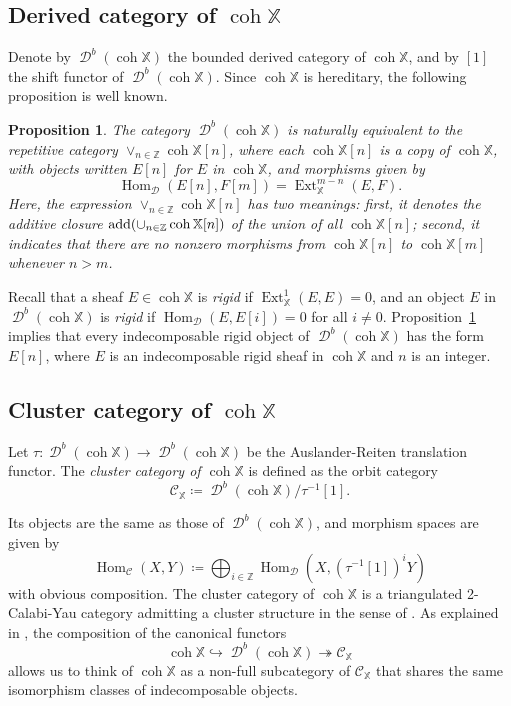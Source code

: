 \documentclass[11pt,a4paper,reqno]{amsart}%
\theoremstyle{plain}
\newtheorem{proposition}[proposition]{Proposition}
\theoremstyle{definition}
\numberwithin{equation}{section}
\numberwithin{equation}{section}
\def\ZZ{\mathbb{Z}}
\def\XX{\mathbb{X}}
\newcommand{\cC}{\mathcal{C}}
\newcommand{\cD}{\mathcal{D}}
\newcommand{\Hom}{\operatorname{Hom}\nolimits}
\newcommand{\Ext}{\operatorname{Ext}\nolimits}
\newcommand{\D}{\operatorname{\mathcal{D}}}
\def\coh{\operatorname{coh}}
\def\Dcoh{\D^b(\coh \XX)}
\def\Hom{\operatorname{Hom}}
\def\Ext{\operatorname{Ext}}
\def\coh{\operatorname{coh}}
\begin{document}
\subsection{Derived category of $\coh\XX$} 
Denote by $\Dcoh$ the   bounded derived category of $\coh\XX$,  and by $[1]$ the   shift   functor of $\Dcoh$.  
Since $\coh\XX$ is hereditary,  
 the following proposition is well known.

\begin{proposition}\label{prop:db}
    The category $\Dcoh$ is naturally equivalent to the repetitive category  $\lor_{n\in\ZZ}\coh\XX[n]$,
where each  $\coh\XX[n]$ is a copy of $\coh\XX$, with objects written $E[n]$ for $E$ in  $\coh\XX$, and
morphisms given by
\[
\Hom_{\cD}(E[n], F[m])=\Ext_{\XX}^{m-n}(E,F).
\]  
 Here, the expression   $\lor_{n\in\ZZ}\coh\XX[n]$ has two meanings: first, it denotes the additive closure   ${\rm add}(\cup_{n\in\ZZ}\coh\XX[n])$  of the union of all  $\coh\XX[n]$; second, it indicates that there are no nonzero morphisms  from  $\coh\XX[n]$  to $\coh\XX[m]$ 
whenever $n > m$.
\end{proposition}
 

  Recall that   a sheaf $E\in\coh\XX$ is   \emph{rigid} if $\Ext^1_\XX(E,E)=0$, and 
 an object $E$ in $\Dcoh$ is  \emph{rigid} if $\Hom_{\cD}(E, E[i])= 0$ for all $i\ne0$.  Proposition~\ref{prop:db} implies that every indecomposable rigid object of  $\Dcoh$  has the form $E[n]$, where $E $ is an indecomposable rigid sheaf in    $\coh\XX$ and $n$ is an integer. 
  

\subsection{Cluster category of   $\coh\XX$} 
 Let $\tau:\Dcoh\to \Dcoh$ be the Auslander-Reiten translation functor.
The {\it cluster category of   $\coh\XX$} is defined as the orbit category \[\cC_\XX\coloneqq\Dcoh/\tau^{-1}[1].\] 

 Its objects  
are the same as those of $\Dcoh$, 
and morphism spaces are given by \[\Hom_\cC( {X}, {Y})\coloneqq
 \bigoplus_{i\in\ZZ}\Hom_{\cD}(X,(\tau^{-1}[1])^iY)
 \]
 with obvious composition. 
 The cluster category of $\coh\XX$ is a 
triangulated 2-Calabi-Yau category \cite{K}
admitting a cluster structure in the sense of \cite{BIRS}. 
 As explained in \cite{BKL},
  the composition of the canonical functors
  \[
  \coh\XX \hookrightarrow    \Dcoh \twoheadrightarrow\cC_\XX
  \]
   allows us to think of $\coh\XX$ as a non-full subcategory of  $ \cC_\XX$  that shares the same isomorphism classes of indecomposable objects. 
    
\end{document}
